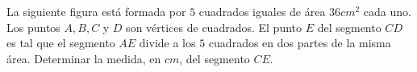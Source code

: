 La siguiente figura está formada por $5$ cuadrados iguales de área $36 cm^2$ cada uno. Los puntos $A, B, C$ y $D$ son vértices de cuadrados. El punto $E$ del segmento $CD$ es tal que el segmento $AE$ divide a los $5$ cuadrados en dos partes de la misma área. Determinar la medida, en $cm$, del segmento $CE$.